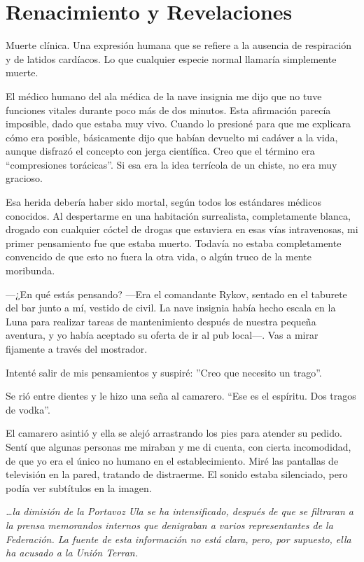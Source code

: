 \chapter{Renacimiento y Revelaciones}\label{sec:renacimiento-y-revelaciones}

Muerte clínica. Una expresión humana que se refiere a la ausencia de respiración y de latidos cardíacos. Lo que cualquier especie normal llamaría simplemente muerte.

El médico humano del ala médica de la nave insignia me dijo que no tuve funciones vitales durante poco más de dos minutos. Esta afirmación parecía imposible, dado que estaba muy vivo. Cuando lo presioné para que me explicara cómo era posible, básicamente dijo que habían devuelto mi cadáver a la vida, aunque disfrazó el concepto con jerga científica. Creo que el término era ``compresiones torácicas''. Si esa era la idea terrícola de un chiste, no era muy gracioso.

Esa herida debería haber sido mortal, según todos los estándares médicos conocidos. Al despertarme en una habitación surrealista, completamente blanca, drogado con cualquier cóctel de drogas que estuviera en esas vías intravenosas, mi primer pensamiento fue que estaba muerto. Todavía no estaba completamente convencido de que esto no fuera la otra vida, o algún truco de la mente moribunda.

—¿En qué estás pensando? —Era el comandante Rykov, sentado en el taburete del bar junto a mí, vestido de civil. La nave insignia había hecho escala en la Luna para realizar tareas de mantenimiento después de nuestra pequeña aventura, y yo había aceptado su oferta de ir al pub local—. Vas a mirar fijamente a través del mostrador.

Intenté salir de mis pensamientos y suspiré: ''Creo que necesito un trago''.

Se rió entre dientes y le hizo una seña al camarero. ``Ese es el espíritu. Dos tragos de vodka''.

El camarero asintió y ella se alejó arrastrando los pies para atender su pedido. Sentí que algunas personas me miraban y me di cuenta, con cierta incomodidad, de que yo era el único no humano en el establecimiento. Miré las pantallas de televisión en la pared, tratando de distraerme. El sonido estaba silenciado, pero podía ver subtítulos en la imagen.

\textit{…la dimisión de la Portavoz Ula se ha intensificado, después de que se filtraran a la prensa memorandos internos que denigraban a varios representantes de la Federación. La fuente de esta información no está clara, pero, por supuesto, ella ha acusado a la Unión Terran.}

